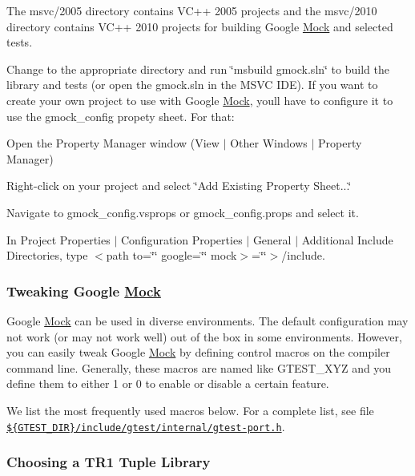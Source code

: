 The msvc/2005 directory contains V\+C++ 2005 projects and the msvc/2010 directory contains V\+C++ 2010 projects for building Google \hyperlink{classMock}{Mock} and selected tests.

Change to the appropriate directory and run \char`\"{}msbuild gmock.\+sln\char`\"{} to build the library and tests (or open the gmock.\+sln in the M\+S\+VC I\+DE). If you want to create your own project to use with Google \hyperlink{classMock}{Mock}, you\textquotesingle{}ll have to configure it to use the {\ttfamily gmock\+\_\+config} propety sheet. For that\+:


\begin{DoxyItemize}
\item Open the Property Manager window (View $\vert$ Other Windows $\vert$ Property Manager)
\item Right-\/click on your project and select \char`\"{}\+Add Existing Property Sheet...\char`\"{}
\item Navigate to {\ttfamily gmock\+\_\+config.\+vsprops} or {\ttfamily gmock\+\_\+config.\+props} and select it.
\item In Project Properties $\vert$ Configuration Properties $\vert$ General $\vert$ Additional Include Directories, type $<$path to=\char`\"{}\char`\"{} google=\char`\"{}\char`\"{} mock$>$=\char`\"{}\char`\"{}$>$/include.
\end{DoxyItemize}

\subsubsection*{Tweaking Google \hyperlink{classMock}{Mock}}

Google \hyperlink{classMock}{Mock} can be used in diverse environments. The default configuration may not work (or may not work well) out of the box in some environments. However, you can easily tweak Google \hyperlink{classMock}{Mock} by defining control macros on the compiler command line. Generally, these macros are named like {\ttfamily G\+T\+E\+S\+T\+\_\+\+X\+YZ} and you define them to either 1 or 0 to enable or disable a certain feature.

We list the most frequently used macros below. For a complete list, see file \href{../googletest/include/gtest/internal/gtest-port.h}{\tt \$\{G\+T\+E\+S\+T\+\_\+\+D\+IR\}/include/gtest/internal/gtest-\/port.h}.

\subsubsection*{Choosing a T\+R1 Tuple Library}

